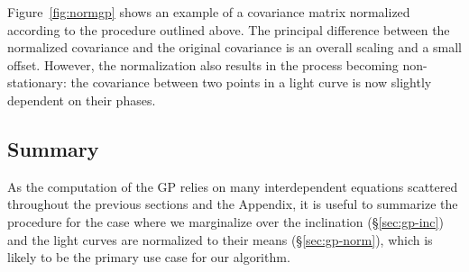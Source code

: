 \documentclass[modern,linenumbers]{aastex62}
\begin{document}
Figure~\ref{fig:normgp} shows an example of a covariance matrix normalized
according to the procedure outlined above. The principal difference between
the normalized covariance and the original covariance is an overall
scaling and a small offset. However, the normalization also results in
the process becoming non-stationary: the covariance between two points in
a light curve is now slightly dependent on their phases.


\subsection{Summary}
\label{sec:gp-summary}
%
As the computation of the GP relies on many interdependent equations
scattered throughout the previous sections and the Appendix, it
is useful to summarize the procedure for the case where we marginalize
over the inclination (\S\ref{sec:gp-inc}) and the light curves are
normalized to their means (\S\ref{sec:gp-norm}), which is likely to be the primary
use case for our algorithm.
\end{document}
